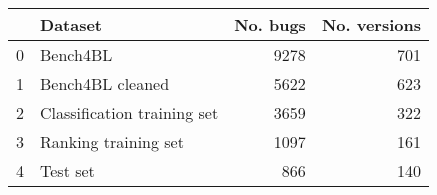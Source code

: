 \begin{tabular}{llrr}
\toprule
{} &                      Dataset &  No. bugs &  No. versions \\
\midrule
0 &                     Bench4BL &      9278 &           701 \\
1 &             Bench4BL cleaned &      5622 &           623 \\
2 &  Classification training set &      3659 &           322 \\
3 &         Ranking training set &      1097 &           161 \\
4 &                     Test set &       866 &           140 \\
\bottomrule
\end{tabular}
